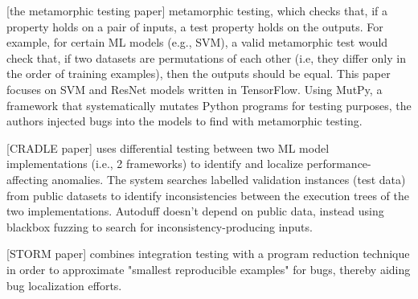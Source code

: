 \documentclass{article}
\begin{document}
[the metamorphic testing paper] metamorphic testing, which checks that, if a property holds on a pair of inputs, a test property holds on the outputs. For example, for certain ML models (e.g., SVM), a valid metamorphic test would check that, if two datasets are permutations of each other (i.e, they differ only in the order of training examples), then the outputs should be equal. This paper focuses on SVM and ResNet models written in TensorFlow. Using MutPy, a framework that systematically mutates Python programs for testing purposes, the authors injected bugs into the models to find with metamorphic testing.

[CRADLE paper] uses differential testing between two ML model implementations (i.e., 2 frameworks) to identify and localize performance-affecting anomalies. The system searches labelled validation instances (test data) from public datasets to identify inconsistencies between the execution trees of the two implementations. Autoduff doesn't depend on public data, instead using blackbox fuzzing to search for inconsistency-producing inputs.

[STORM paper] combines integration testing with a program reduction technique in order to approximate "smallest reproducible examples" for bugs, thereby aiding bug localization efforts.
\end{document}
